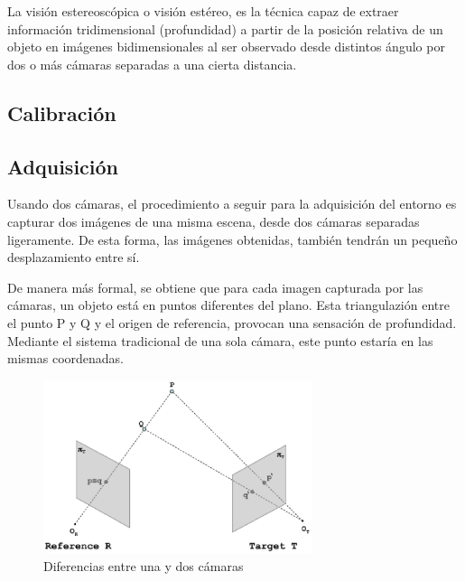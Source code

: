 

La visión estereoscópica o visión estéreo, es la técnica capaz de extraer
información tridimensional (profundidad) a partir de la posición relativa de un
objeto en imágenes bidimensionales al ser observado desde distintos ángulo por
dos o más cámaras separadas a una cierta distancia.

\subsection{Calibración}

\subsection{Adquisición}

Usando dos cámaras, el procedimiento a seguir para la adquisición del entorno
es capturar dos imágenes de una misma escena, desde dos cámaras separadas
ligeramente. De esta forma, las imágenes obtenidas, también tendrán un pequeño 
desplazamiento entre sí.

De manera más formal, se obtiene que para cada imagen capturada por las
cámaras, un objeto está en puntos diferentes del plano. Esta triangulazión
entre el punto P y Q y el origen de referencia, provocan una sensación de
profundidad. Mediante el sistema tradicional de una sola cámara, este punto
estaría en las mismas coordenadas.

\begin{figure}[!th]
  \begin{center}
    \includegraphics[width=0.7\textwidth]{images/cap2/VisionEstereo.eps}
    \caption{Diferencias entre una y dos cámaras}
    \label{fig:VisionEstereo}
  \end{center}
\end{figure}

